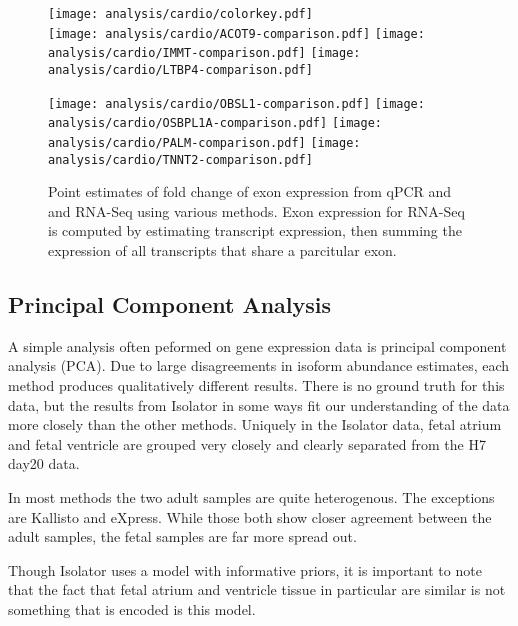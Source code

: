 \documentclass{article}
\begin{document}
\begin{figure}[H]
\texttt{[image: analysis/cardio/colorkey.pdf]} \\
\texttt{[image: analysis/cardio/ACOT9-comparison.pdf]}
\texttt{[image: analysis/cardio/IMMT-comparison.pdf]}
\texttt{[image: analysis/cardio/LTBP4-comparison.pdf]}
\end{figure}
\begin{figure}[H]
\ContinuedFloat
\texttt{[image: analysis/cardio/OBSL1-comparison.pdf]}
\texttt{[image: analysis/cardio/OSBPL1A-comparison.pdf]}
\texttt{[image: analysis/cardio/PALM-comparison.pdf]}
\texttt{[image: analysis/cardio/TNNT2-comparison.pdf]}
\caption{Point estimates of fold change of exon expression from qPCR and and
RNA-Seq using various methods. Exon expression for RNA-Seq is computed by
estimating transcript expression, then summing the expression of all transcripts
that share a parcitular exon.}
\label{fig:cardiofoldchange}
\end{figure}

\subsection{Principal Component Analysis}\label{cardiopca}

A simple analysis often peformed on gene expression data is principal component
analysis (PCA). Due to large disagreements in isoform abundance estimates, each
method produces qualitatively different results. There is no ground truth for
this data, but the results from Isolator in some ways fit our understanding of
the data more closely than the other methods. Uniquely in the Isolator data,
fetal atrium and fetal ventricle are grouped very closely and clearly separated
from the H7 day20 data.

In most methods the two adult samples are quite heterogenous. The exceptions are
Kallisto and eXpress. While those both show closer agreement between the adult
samples, the fetal samples are far more spread out.

Though Isolator uses a model with informative priors, it is important to note
that the fact that fetal atrium and ventricle tissue in particular are similar
is not something that is encoded is this model.
\end{document}
